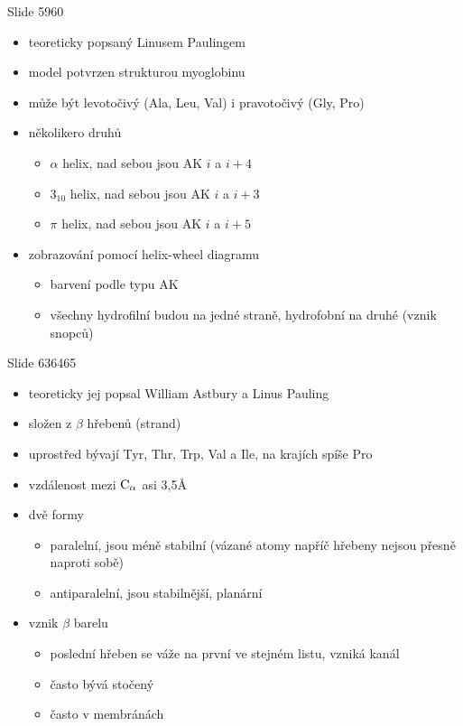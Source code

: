 \documentclass[DIV=8]{scrreprt}
\begin{document}
Slide 5960
\begin{itemize}
    \item teoreticky popsaný Linusem Paulingem
    \item model potvrzen strukturou myoglobinu
    \item může být levotočivý (Ala, Leu, Val) i pravotočivý (Gly, Pro)
    \item několikero druhů
\begin{itemize}
    \item \(\alpha\) helix, nad sebou jsou AK \(i\) a \(i + 4\)
    \item \(3_{10}\) helix, nad sebou jsou AK \(i\) a \(i + 3\)
    \item \(\pi\) helix, nad sebou jsou AK \(i\) a \(i + 5\)
\end{itemize}

    \item zobrazování pomocí helix-wheel diagramu
\begin{itemize}
    \item barvení podle typu AK
    \item všechny hydrofilní budou na jedné straně, hydrofobní na druhé (vznik snopců)
\end{itemize}

\end{itemize}


Slide 636465
\begin{itemize}
    \item teoreticky jej popsal William Astbury a Linus Pauling
    \item složen z \(\beta\) hřebenů (strand)
    \item uprostřed bývají Tyr, Thr, Trp, Val a Ile, na krajích spíše Pro
    \item vzdálenost mezi \(\ce{C_\alpha}\) asi 3,5Å
    \item dvě formy
\begin{itemize}
    \item paralelní, jsou méně stabilní (vázané atomy napříč hřebeny nejsou přesně naproti sobě)
    \item antiparalelní, jsou stabilnější, planární
\end{itemize}

    \item vznik \(\beta\) barelu
\begin{itemize}
    \item poslední hřeben se váže na první ve stejném listu, vzniká kanál
    \item často bývá stočený
    \item často v membránách
\end{itemize}

\end{itemize}
\end{document}
